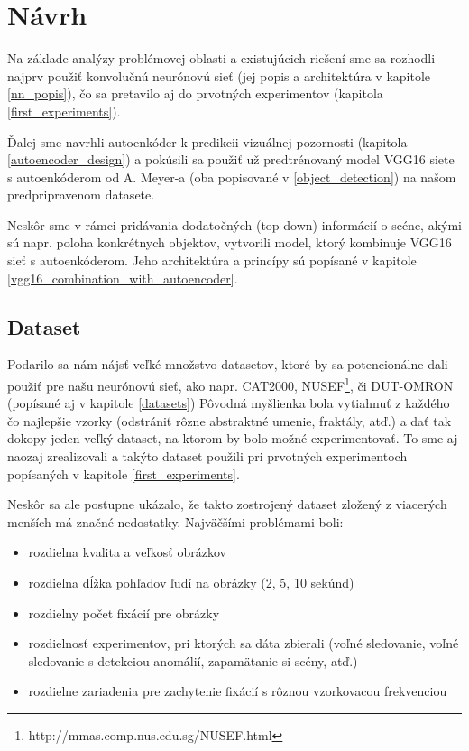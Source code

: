 
\newpage
\section{Návrh}
\label{design}

Na základe analýzy problémovej oblasti a existujúcich riešení sme sa rozhodli najprv použiť konvolučnú neurónovú sieť (jej popis a architektúra v kapitole \ref{nn_popis}), čo sa pretavilo aj do prvotných experimentov (kapitola \ref{first_experiments}).

Ďalej sme navrhli autoenkóder k predikcii vizuálnej pozornosti (kapitola \ref{autoencoder_design}) a pokúsili sa použiť už predtrénovaný model VGG16 siete s autoenkóderom od A. Meyer-a (oba popisované v \ref{object_detection}) na našom predpripravenom datasete. 

Neskôr sme v rámci pridávania dodatočných (top-down) informácií o scéne, akými sú napr. poloha konkrétnych objektov, vytvorili model, ktorý kombinuje VGG16 sieť s autoenkóderom. Jeho architektúra a princípy sú popísané v kapitole \ref{vgg16_combination_with_autoencoder}.

\subsection{Dataset}
\label{dataset_description}
Podarilo sa nám nájsť veľké množstvo datasetov, ktoré by sa potencionálne dali použiť pre našu neurónovú sieť, ako napr. 
CAT2000\cite{borji2015cat2000}, NUSEF\footnote{http://mmas.comp.nus.edu.sg/NUSEF.html}, či DUT-OMRON\cite{dut-omron} (popísané aj v kapitole \ref{datasets}) Pôvodná myšlienka bola vytiahnuť z každého čo najlepšie vzorky (odstrániť rôzne abstraktné umenie, fraktály, atď.) a dať tak dokopy jeden veľký dataset, na ktorom by bolo možné experimentovať. To sme aj naozaj zrealizovali a takýto dataset použili pri prvotných experimentoch popísaných v kapitole \ref{first_experiments}.

Neskôr sa ale postupne ukázalo, že takto zostrojený dataset zložený z viacerých menších má značné nedostatky. Najväčšími problémami boli:
\begin{itemize}
	\item rozdielna kvalita a veľkosť obrázkov
	\item rozdielna dĺžka pohľadov ľudí na obrázky (2, 5, 10 sekúnd)
	\item rozdielny počet fixácií pre obrázky
	\item rozdielnosť experimentov, pri ktorých sa dáta zbierali (voľné sledovanie, voľné sledovanie s detekciou anomálií, zapamätanie si scény, atď.)
	\item rozdielne zariadenia pre zachytenie fixácií s rôznou vzorkovacou frekvenciou 
\end{itemize}

